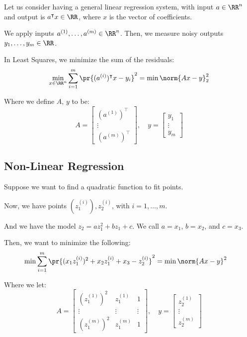\documentclass[openany]{book}
\begin{document}
\begin{example}
	Let us consider having a general linear regression system, with input $a \in\RR^{n}$ and output is $a^{\intercal}x \in \RR$, where $x$ is the vector of coefficients.
	
	We apply inputs $a^{(1)}, \ldots, a^{(m)} \in \RR^{n}$. Then, we measure noisy outputs $y_1, \ldots, y_m \in \RR$.
	
	In Least Squares, we minimize the sum of the residuals:
	\begin{equation*}
		\min_{x \in \RR^{n}} \sum_{i=1}^{m} \pr{(a^{(i)})^{\intercal}x - y_i}^{2} = \min\norm{Ax - y}_2^{2}
	\end{equation*}

	Where we define $A$, $y$ to be:
	\begin{equation*}
		A = \begin{bmatrix}
			(a^{(1)})^{\intercal} \\ \vdots \\ (a^{(m)})^{\intercal}
		\end{bmatrix}, \quad y = \begin{bmatrix}
		 y_1 \\ \vdots \\ y_m
	\end{bmatrix}
	\end{equation*}
\end{example}

\subsection{Non-Linear Regression}
\begin{example}
	Suppose we want to find a quadratic function to fit points.
	
	
	Now, we have points $(z_1^{(i)}), z_2^{(i)}$, with $i = 1, \ldots, m$.
	
	And we have the model $z_2 = az_1^{2} + bz_1 + c$. We call $a = x_1$, $b = x_2$, and $c = x_3$.
	
	Then, we want to minimize the following:
	\begin{align*}
		\min \sum_{i=1}^{m} \pr{ (x_1z_1^{(i)})^{2} + x_2z_1^{(i)} + x_3 - z_2^{(i)}}^{2} &= \min\norm{Ax-y}^{2}
	\end{align*}

	Where we let:
	\begin{equation*}
		A = \begin{bmatrix}
			(z_1^{(1)})^{2} & z_1^{(1)} & 1 \\
			\vdots & \vdots & \vdots \\
			(z_1^{(m)})^{2} & z_1^{(m)} & 1
		\end{bmatrix}, \quad y = \begin{bmatrix}
		z_2^{(1)} \\ \vdots \\ z_2^{(m)}
	\end{bmatrix}
	\end{equation*}
\end{example}
\end{document}
